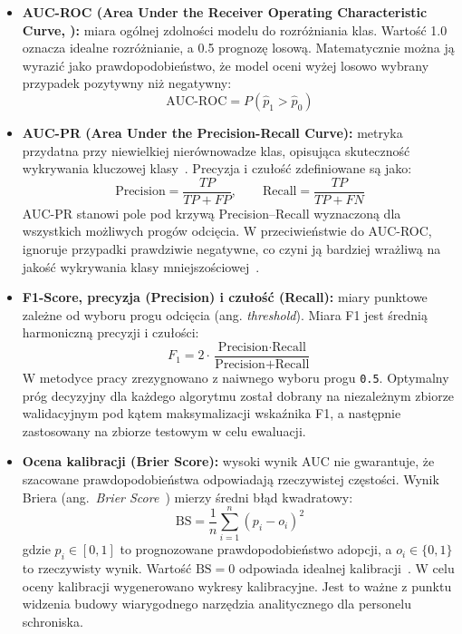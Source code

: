 \begin{itemize}\itemsep2pt
\item \textbf{AUC-ROC (Area Under the Receiver Operating Characteristic Curve, \cite{Fawcett2006}):} miara ogólnej zdolności modelu do rozróżniania klas. Wartość 1.0 oznacza idealne rozróżnianie, a 0.5 prognozę losową. Matematycznie można ją wyrazić jako prawdopodobieństwo, że model oceni wyżej losowo wybrany przypadek pozytywny niż negatywny:
\begin{equation}
\text{AUC-ROC} = P(\hat{p}_1 > \hat{p}_0)
\end{equation}
\item \textbf{AUC-PR (Area Under the Precision-Recall Curve):} metryka przydatna przy niewielkiej nierównowadze klas, opisująca skuteczność wykrywania kluczowej klasy~\cite{Davis2006}. Precyzja i czułość zdefiniowane są jako:
\begin{equation}
\text{Precision} = \frac{TP}{TP + FP}, \qquad \text{Recall} = \frac{TP}{TP + FN}
\end{equation}
AUC-PR stanowi pole pod krzywą Precision--Recall wyznaczoną dla wszystkich możliwych progów odcięcia. W przeciwieństwie do AUC-ROC, ignoruje przypadki prawdziwie negatywne, co czyni ją bardziej wrażliwą na jakość wykrywania klasy mniejszościowej~\cite{Davis2006}.
\item \textbf{F1-Score, precyzja (Precision) i czułość (Recall):} miary punktowe zależne od wyboru progu odcięcia (ang. \emph{threshold}). Miara F1 jest średnią harmoniczną precyzji i czułości:
\begin{equation}
F_1 = 2 \cdot \frac{\text{Precision} \cdot \text{Recall}}{\text{Precision} + \text{Recall}}
\end{equation}
W metodyce pracy zrezygnowano z naiwnego wyboru progu \texttt{0.5}. Optymalny próg decyzyjny dla każdego algorytmu został dobrany na niezależnym zbiorze walidacyjnym pod kątem maksymalizacji wskaźnika F1, a następnie zastosowany na zbiorze testowym w celu ewaluacji.
\item \textbf{Ocena kalibracji (Brier Score):} wysoki wynik AUC nie gwarantuje, że szacowane prawdopodobieństwa odpowiadają rzeczywistej częstości. Wynik Briera (ang.\ \emph{Brier Score}~\cite{Brier1950}) mierzy średni błąd kwadratowy:
\begin{equation}
\text{BS} = \frac{1}{n} \sum_{i=1}^{n} \left(p_i - o_i\right)^2
\label{eq:brier-score}
\end{equation}
gdzie $p_i \in [0,1]$ to prognozowane prawdopodobieństwo adopcji, a $o_i \in \{0,1\}$ to rzeczywisty wynik. Wartość $\text{BS} = 0$ odpowiada idealnej kalibracji~\cite{NiculescuMizil2005}. W celu oceny kalibracji wygenerowano wykresy kalibracyjne. Jest to ważne z punktu widzenia budowy wiarygodnego narzędzia analitycznego dla personelu schroniska.
\end{itemize}

